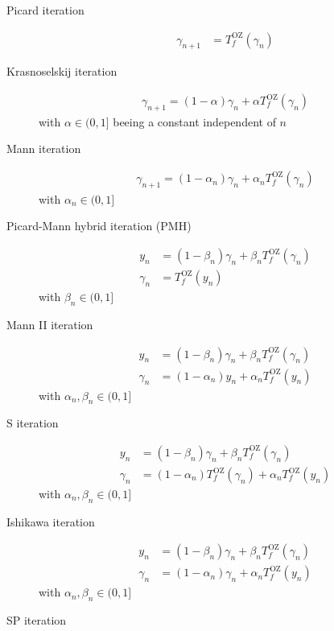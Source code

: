 \begin{description}
\item[Picard iteration \cite{Picard1890}]
\begin{align}
\gamma_{n+1} &= T^\mathrm{OZ}_f(\gamma_{n})
\end{align}
\item[Krasnoselskij iteration \cite{Krasnoselskij1955}]
\begin{align}
\gamma_{n+1} = (1-\alpha)\gamma_{n}+\alpha T^\mathrm{OZ}_f(\gamma_{n})
\end{align}
with $\alpha \in (0,1]$ beeing a constant independent of $n$
\item[Mann iteration \cite{Mann1953}]
\begin{align}
\gamma_{n+1} = (1-\alpha_n)\gamma_{n}+\alpha_n T^\mathrm{OZ}_f(\gamma_{n})
\end{align}
with $\alpha_n \in (0,1]$
\item[Picard-Mann hybrid iteration (PMH) \cite{Khan2013}]
\begin{align}
y_n      &= (1-\beta_n) \gamma_n + \beta_n T^\mathrm{OZ}_f(\gamma_{n}) \\
\gamma_n &= T^\mathrm{OZ}_f(y_{n})
\end{align}
with $\beta_n \in (0,1]$
\item[Mann II iteration \cite{Karahan2013a}]
\begin{align}
y_n      &= (1-\beta_n) \gamma_n + \beta_n T^\mathrm{OZ}_f(\gamma_{n}) \\
\gamma_n &= (1-\alpha_n) y_n + \alpha_n T^\mathrm{OZ}_f(y_{n})
\end{align}
with $\alpha_n,\beta_n \in (0,1]$
\item[S iteration \cite{Karahan2013,Agarwal2007}]
\begin{align}
y_n      &= (1-\beta_n) \gamma_n + \beta_n T^\mathrm{OZ}_f(\gamma_{n}) \\
\gamma_n &= (1-\alpha_n) T^\mathrm{OZ}_f(\gamma_{n}) + \alpha_n T^\mathrm{OZ}_f(y_{n})
\end{align}
with $\alpha_n,\beta_n \in (0,1]$
\item[Ishikawa iteration \cite{Ishikawa1974}]
\begin{align}
y_n      &= (1-\beta_n)  \gamma_n + \beta_n T^\mathrm{OZ}_f(\gamma_{n}) \\
\gamma_n &= (1-\alpha_n) \gamma_n + \alpha_n T^\mathrm{OZ}_f(y_{n})
\end{align}
with $\alpha_n,\beta_n \in (0,1]$
\item[SP iteration \cite{Phuengrattana2011}]

\end{description}
